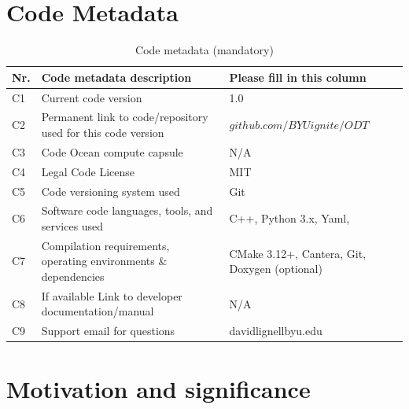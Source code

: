 \documentclass[preprint,12pt, a4paper]{elsarticle}
\begin{document}
\section*{Code Metadata}
\label{metadata}

\begin{table}[H]
\begin{tabular}{|l|p{6.5cm}|p{6.5cm}|}
\hline
\textbf{Nr.} & \textbf{Code metadata description} & \textbf{Please fill in this column} \\
\hline
C1 & Current code version & 1.0 \\
\hline
C2 & Permanent link to code/repository used for this code version & $github.com/BYUignite/ODT$ \\
\hline
C3 & Code Ocean compute capsule & N/A\\
\hline
C4 & Legal Code License   & MIT \\
\hline
C5 & Code versioning system used & Git \\
\hline
C6 & Software code languages, tools, and services used & C++, Python 3.x, Yaml,  \\
\hline
C7 & Compilation requirements, operating environments \& dependencies & CMake 3.12+, Cantera, Git, Doxygen (optional) \\
\hline
C8 & If available Link to developer documentation/manual & N/A \\
\hline
C9 & Support email for questions & davidlignellbyu.edu \\
\hline
\end{tabular}
\caption{Code metadata (mandatory)}
\end{table}


\linenumbers


\section{Motivation and significance}
\label{sec:motivation}
\end{document}
